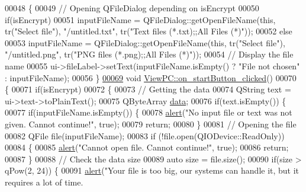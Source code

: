 \begin{DoxyCode}
00048 \{
00049     \textcolor{comment}{// Opening QFileDialog depending on isEncrypt}
00050     \textcolor{keywordflow}{if}(isEncrypt)
00051         inputFileName = QFileDialog::getOpenFileName(\textcolor{keyword}{this}, tr(\textcolor{stringliteral}{"Select file"}), \textcolor{stringliteral}{"/untitled.txt"}, tr(\textcolor{stringliteral}{"Text
       files (*.txt);;All Files (*)"}));
00052     \textcolor{keywordflow}{else}
00053         inputFileName = QFileDialog::getOpenFileName(\textcolor{keyword}{this}, tr(\textcolor{stringliteral}{"Select file"}), \textcolor{stringliteral}{"/untitled.png"}, tr(\textcolor{stringliteral}{"PNG
       files (*.png);;All Files (*)"}));
00054     \textcolor{comment}{// Display the file name}
00055     ui->fileLabel->setText(inputFileName.isEmpty() ? \textcolor{stringliteral}{"File not chosen"} : inputFileName);
00056 \}
\hypertarget{viewpc_8cpp_source_l00069}{}\hyperlink{class_view_p_c_a456d75b7c5d3a089302a576e7359f1f4}{00069} \textcolor{keywordtype}{void} \hyperlink{class_view_p_c_a456d75b7c5d3a089302a576e7359f1f4}{ViewPC::on\_startButton\_clicked}()
00070 \{
00071     \textcolor{keywordflow}{if}(isEncrypt)
00072     \{
00073         \textcolor{comment}{// Getting the data}
00074         QString text = ui->text->toPlainText();
00075         QByteArray \hyperlink{namespace_errors_dict_setup_adf4c30d205d29df7343e26f7c62b0685}{data};
00076         \textcolor{keywordflow}{if}(text.isEmpty()) \{
00077             \textcolor{keywordflow}{if}(inputFileName.isEmpty()) \{
00078                 \hyperlink{class_view_p_c_a7c467169467789561078abc9d4fe57bd}{alert}(\textcolor{stringliteral}{"No input file or text was not given. Cannot continue!"}, \textcolor{keyword}{true});
00079                 \textcolor{keywordflow}{return};
00080             \}
00081             \textcolor{comment}{// Opening the file}
00082             QFile file(inputFileName);
00083             \textcolor{keywordflow}{if} (!file.open(QIODevice::ReadOnly))
00084             \{
00085                 \hyperlink{class_view_p_c_a7c467169467789561078abc9d4fe57bd}{alert}(\textcolor{stringliteral}{"Cannot open file. Cannot continue!"}, \textcolor{keyword}{true});
00086                 \textcolor{keywordflow}{return};
00087             \}
00088             \textcolor{comment}{// Check the data size}
00089             \textcolor{keyword}{auto} size = file.size();
00090             \textcolor{keywordflow}{if}(size > qPow(2, 24)) \{
00091                 \hyperlink{class_view_p_c_a7c467169467789561078abc9d4fe57bd}{alert}(\textcolor{stringliteral}{"Your file is too big, our systems can handle it, but it requires a lot of time.
}
\end{DoxyCode}
